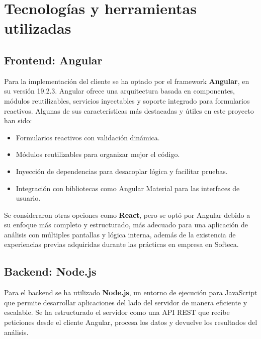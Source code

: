 \section{Tecnologías y herramientas utilizadas}

\subsection{Frontend: Angular}

Para la implementación del cliente se ha optado por el framework \textbf{Angular}, en su versión 19.2.3. Angular ofrece una arquitectura basada en componentes, módulos reutilizables, servicios inyectables y soporte integrado para formularios reactivos. Algunas de sus características más destacadas y útiles en este proyecto han sido:

\begin{itemize}
  \item Formularios reactivos con validación dinámica.
  \item Módulos reutilizables para organizar mejor el código.
  \item Inyección de dependencias para desacoplar lógica y facilitar pruebas.
  \item Integración con bibliotecas como Angular Material para las interfaces de usuario.
\end{itemize}

Se consideraron otras opciones como \textbf{React}, pero se optó por Angular debido a su enfoque más completo y estructurado, más adecuado para una aplicación de análisis con múltiples pantallas y lógica interna, además de la existencia de experiencias previas adquiridas durante las prácticas en empresa en Softeca.

\subsection{Backend: Node.js}

Para el backend se ha utilizado \textbf{Node.js}, un entorno de ejecución para JavaScript que permite desarrollar aplicaciones del lado del servidor de manera eficiente y escalable. Se ha estructurado el servidor como una API REST que recibe peticiones desde el cliente Angular, procesa los datos y devuelve los resultados del análisis.

